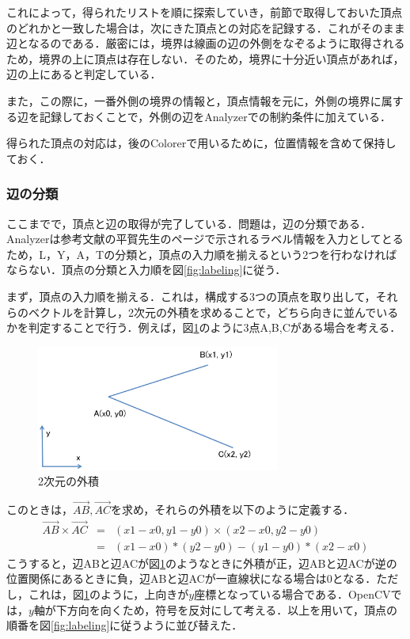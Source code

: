 \documentclass{jarticle}
\begin{document}
これによって，得られたリストを順に探索していき，前節で取得しておいた頂点のどれかと一致した場合は，次にきた頂点との対応を記録する．これがそのまま辺となるのである．厳密には，境界は線画の辺の外側をなぞるように取得されるため，境界の上に頂点は存在しない．そのため，境界に十分近い頂点があれば，辺の上にあると判定している．

また，この際に，一番外側の境界の情報と，頂点情報を元に，外側の境界に属する辺を記録しておくことで，外側の辺をAnalyzerでの制約条件に加えている．

得られた頂点の対応は，後のColorerで用いるために，位置情報を含めて保持しておく．






\subsubsection{辺の分類}
ここまでで，頂点と辺の取得が完了している．問題は，辺の分類である．Analyzerは参考文献\cite{ref:labeling}の平賀先生のページで示されるラベル情報を入力としてとるため，L，Y，A，Tの分類と，頂点の入力順を揃えるという2つを行わなければならない．頂点の分類と入力順を図\ref{fig:labeling}に従う．

まず，頂点の入力順を揃える．これは，構成する3つの頂点を取り出して，それらのベクトルを計算し，2次元の外積を求めることで，どちら向きに並んでいるかを判定することで行う．例えば，図\ref{fig:outer}のように3点A,B,Cがある場合を考える．

\begin{figure}[H]
\begin{center}
\includegraphics[width=80mm]{image/outer.png}
\caption{2次元の外積}
\label{fig:outer}
\end{center}
\end{figure}

このときは，$\overrightarrow{AB},\overrightarrow{AC}$を求め，それらの外積を以下のように定義する．
\begin{eqnarray}
	\overrightarrow{AB} \times \overrightarrow{AC} &=& (x1 - x0, y1 - y0) \times (x2 - x0, y2 - y0) \nonumber \\
	&=& (x1 - x0) * (y2 - y0) - (y1 - y0) * (x2 - x0)
\end{eqnarray}
こうすると，辺ABと辺ACが図\ref{fig:outer}のようなときに外積が正，辺ABと辺ACが逆の位置関係にあるときに負，辺ABと辺ACが一直線状になる場合は$0$となる．ただし，これは，図\ref{fig:outer}のように，上向きが$y$座標となっている場合である．OpenCVでは，$y$軸が下方向を向くため，符号を反対にして考える．以上を用いて，頂点の順番を図\ref{fig:labeling}に従うように並び替えた．
\end{document}

